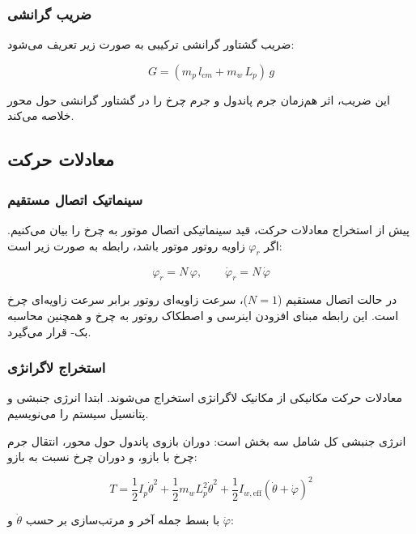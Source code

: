 \subsubsection{ضریب گرانشی}

ضریب گشتاور گرانشی ترکیبی به صورت زیر تعریف می‌شود:

\begin{equation}
    G = (m_p \, l_{cm} + m_w \, L_p) \, g
\end{equation}

این ضریب، اثر هم‌زمان جرم پاندول و جرم چرخ را در گشتاور گرانشی حول محور خلاصه می‌کند.

\subsection{معادلات حرکت}

\subsubsection{سینماتیک اتصال مستقیم}

پیش از استخراج معادلات حرکت، قید سینماتیکی اتصال موتور به چرخ را بیان می‌کنیم. اگر $\varphi_r$ زاویه روتور موتور باشد، رابطه به صورت زیر است:

\begin{equation}
    \varphi_r = N \, \varphi, \qquad \dot{\varphi}_r = N \, \dot{\varphi}
\end{equation}

در حالت اتصال مستقیم ($N = 1$)، سرعت زاویه‌ای روتور برابر سرعت زاویه‌ای چرخ است. این رابطه مبنای افزودن اینرسی و اصطکاک روتور به چرخ و همچنین محاسبه بک- قرار می‌گیرد.

\subsubsection{استخراج لاگرانژی}

معادلات حرکت مکانیکی از مکانیک لاگرانژی استخراج می‌شوند. ابتدا انرژی جنبشی و پتانسیل سیستم را می‌نویسیم.

انرژی جنبشی کل شامل سه بخش است: دوران بازوی پاندول حول محور، انتقال جرم چرخ با بازو، و دوران چرخ نسبت به بازو:

\begin{equation}
    T = \frac{1}{2} I_p \dot{\theta}^2
      + \frac{1}{2} m_w L_p^2 \dot{\theta}^2
      + \frac{1}{2} I_{w,\text{eff}} (\dot{\theta} + \dot{\varphi})^2
\end{equation}

با بسط جمله آخر و مرتب‌سازی بر حسب $\dot{\theta}$ و $\dot{\varphi}$:

